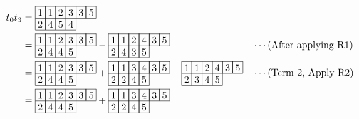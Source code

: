 \begin{align*}
t_0t_3 &= 
\begin{array}[c]{*{6}c}\cline{1-6}
\lr{1}&\lr{1}&\lr{2}&\lr{3}&\lr{3}&\lr{5}\\\cline{1-6}
\lr{2}&\lr{4}&\lr{5}&\lr{4}\\\cline{1-4}
\end{array}\\
    & = \begin{array}[c]{*{6}c}\cline{1-6}
\lr{1}&\lr{1}&\lr{2}&\lr{3}&\lr{3}&\lr{5}\\\cline{1-6}
\lr{2}&\lr{4}&\lr{4}&\lr{5}\\\cline{1-4}
\end{array}
-\begin{array}[c]{*{6}c}\cline{1-6}
\lr{1}&\lr{1}&\lr{2}&\lr{4}&\lr{3}&\lr{5}\\\cline{1-6}
\lr{2}&\lr{4}&\lr{3}&\lr{5}\\\cline{1-4}
\end{array}
    && \cdots (\text{After applying R1})\\
    & = \begin{array}[c]{*{6}c}\cline{1-6}
\lr{1}&\lr{1}&\lr{2}&\lr{3}&\lr{3}&\lr{5}\\\cline{1-6}
\lr{2}&\lr{4}&\lr{4}&\lr{5}\\\cline{1-4}
\end{array}
+\begin{array}[c]{*{6}c}\cline{1-6}
\lr{1}&\lr{1}&\lr{3}&\lr{4}&\lr{3}&\lr{5}\\\cline{1-6}
\lr{2}&\lr{2}&\lr{4}&\lr{5}\\\cline{1-4}
\end{array}
-\begin{array}[c]{*{6}c}\cline{1-6}
\lr{1}&\lr{1}&\lr{2}&\lr{4}&\lr{3}&\lr{5}\\\cline{1-6}
\lr{2}&\lr{3}&\lr{4}&\lr{5}\\\cline{1-4}
\end{array}
    && \cdots (\text{Term 2, Apply R2})\\
    & = \begin{array}[c]{*{6}c}\cline{1-6}
\lr{1}&\lr{1}&\lr{2}&\lr{3}&\lr{3}&\lr{5}\\\cline{1-6}
\lr{2}&\lr{4}&\lr{4}&\lr{5}\\\cline{1-4}
\end{array}
+\begin{array}[c]{*{6}c}\cline{1-6}
\lr{1}&\lr{1}&\lr{3}&\lr{4}&\lr{3}&\lr{5}\\\cline{1-6}
\lr{2}&\lr{2}&\lr{4}&\lr{5}\\\cline{1-4}

\end{array}
\end{align*}
